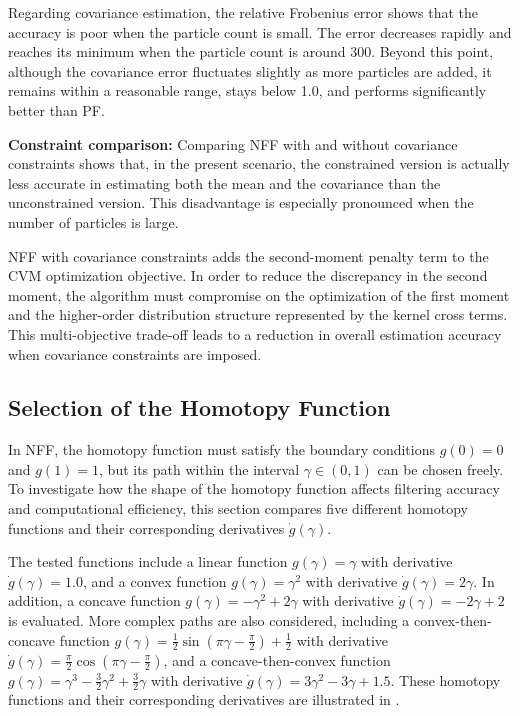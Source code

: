 Regarding covariance estimation, the relative Frobenius error shows that the accuracy is poor when the particle count is small. The error decreases rapidly and reaches its minimum when the particle count is around 300. Beyond this point, although the covariance error fluctuates slightly as more particles are added, it remains within a reasonable range, stays below 1.0, and performs significantly better than PF.

\textbf{Constraint comparison:} Comparing NFF with and without covariance constraints shows that, in the present scenario, the constrained version is actually less accurate in estimating both the mean and the covariance than the unconstrained version. This disadvantage is especially pronounced when the number of particles is large.

NFF with covariance constraints adds the second-moment penalty term  to the CVM optimization objective. In order to reduce the discrepancy in the second moment, the algorithm must compromise on the optimization of the first moment and the higher-order distribution structure represented by the kernel cross terms. This multi-objective trade-off leads to a reduction in overall estimation accuracy when covariance constraints are imposed.
\clearpage

\subsection{Selection of the Homotopy Function}
\label{subsec:homotopy_function_selection}

In NFF, the homotopy function must satisfy the boundary conditions $g(0)=0$ and $g(1)=1$, but its path within the interval $\gamma \in (0, 1)$ can be chosen freely. To investigate how the shape of the homotopy function affects filtering accuracy and computational efficiency, this section compares five different homotopy functions and their corresponding derivatives $\dot{g}(\gamma)$.

The tested functions include a linear function $g(\gamma) = \gamma$ with derivative $\dot{g}(\gamma) = 1.0$, and a convex function $g(\gamma) = \gamma^2$ with derivative $\dot{g}(\gamma) = 2\gamma$. In addition, a concave function $g(\gamma) = -\gamma^2 + 2\gamma$ with derivative $\dot{g}(\gamma) = -2\gamma + 2$ is evaluated. More complex paths are also considered, including a convex-then-concave function
$g(\gamma) = \frac{1}{2}\sin(\pi\gamma - \frac{\pi}{2}) + \frac{1}{2}$
with derivative
$\dot{g}(\gamma) = \frac{\pi}{2}\cos(\pi\gamma - \frac{\pi}{2})$,
and a concave-then-convex function
$g(\gamma) = \gamma^3 - \frac{3}{2}\gamma^2 + \frac{3}{2}\gamma$
with derivative
$\dot{g}(\gamma) = 3\gamma^2 - 3\gamma + 1.5$. These homotopy functions and their corresponding derivatives are illustrated in .

